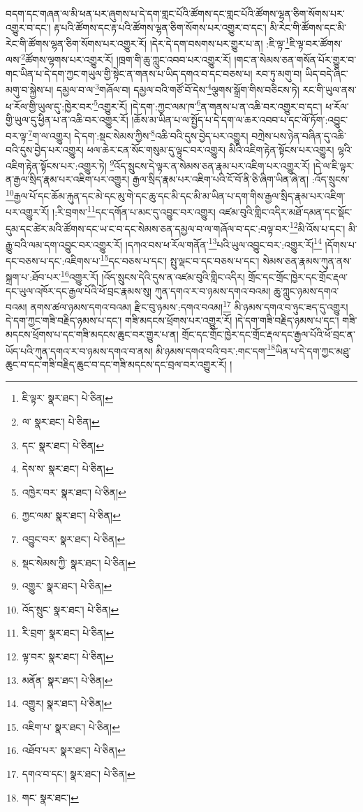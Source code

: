 བདག་དང་གཞན་ལ་མི་ཕན་པར་ཞུགས་པ་དེ་དག་གླང་པོའི་ཚོགས་དང་གླང་པོའི་ཚོགས་ལྷན་ཅིག་སོགས་པར་འགྱུར་བ་དང་། རྟ་པའི་ཚོགས་དང་རྟ་པའི་ཚོགས་ལྷན་ཅིག་སོགས་པར་འགྱུར་བ་དང་། མི་རེང་གི་ཚོགས་དང་མི་རེང་གི་ཚོགས་ལྷན་ཅིག་སོགས་པར་འགྱུར་རོ། །དེར་དེ་དག་བསགས་པར་གྱུར་པ་ན། :ཇི་ལྟ་\footnote{ཇི་ལྟར་  སྣར་ཐང་།  པེ་ཅིན། }ཇི་ལྟ་བར་ཚོགས་ལས་\footnote{ལ་  སྣར་ཐང་།  པེ་ཅིན། }ཚོགས་ལྷགས་པར་འགྱུར་རོ། །ཁྲག་གི་ཆུ་ཀླུང་འབབ་པར་འགྱུར་རོ། །གང་ན་སེམས་ཅན་གསོན་པོར་གྱུར་བ་གང་ཡིན་པ་དེ་དག་ཀྱང་གཡུལ་གྱི་སྟེང་ན་གནས་པ་ཡིད་དགའ་བ་དང་བཅས་པ། རབ་ཏུ་མགུ་བ། ཡིད་བདེ་ཞིང་མགུ་བ་སྐྱེས་པ། དམྱལ་བ་ལ་\footnote{དང་  སྣར་ཐང་།  པེ་ཅིན། }གཞོལ་བ། དམྱལ་བའི་གཙོ་བོ་དེས་\footnote{དེས་ས་  སྣར་ཐང་།  པེ་ཅིན། }ལྕགས་སྒྲོག་གིས་བཅིངས་ཏེ། རང་གི་ཡུལ་ནས་ཕ་རོལ་གྱི་ཡུལ་དུ་:ཁྱེར་བར་\footnote{འཁྱེར་བར་  སྣར་ཐང་།  པེ་ཅིན། }འགྱུར་རོ། །དེ་དག་:ཀྱང་ལམ་ཁ་\footnote{ཀྱང་ལམ་  སྣར་ཐང་།  པེ་ཅིན། }ན་གནས་པ་ན་འཆི་བར་འགྱུར་བ་དང་། ཕ་རོལ་གྱི་ཡུལ་དུ་ཕྱིན་པ་ན་འཆི་བར་འགྱུར་རོ། །ཆོས་མ་ཡིན་པ་ལ་སྤྱོད་པ་དེ་དག་ལ་ཆར་འབབ་པ་དང་ལོ་ཏོག་:འབྱུང་བར་ལྟ་\footnote{འབྱུང་བར་  སྣར་ཐང་།  པེ་ཅིན། }ག་ལ་འགྱུར། དེ་དག་:སྡང་སེམས་ཀྱིས་\footnote{སྡང་སེམས་ཀྱི་  སྣར་ཐང་།  པེ་ཅིན། }འཆི་བའི་དུས་བྱེད་པར་འགྱུར། བཀྲེས་པས་ཉེན་བཞིན་དུ་འཆི་བའི་དུས་བྱེད་པར་འགྱུར། ཕལ་ཆེར་ངན་སོང་གསུམ་དུ་ལྟུང་བར་འགྱུར། མིའི་འཇིག་རྟེན་སྟོངས་པར་འགྱུར། ལྷའི་འཇིག་རྟེན་སྟོངས་པར་:འགྱུར་ཏེ། \footnote{འགྱུར་  སྣར་ཐང་།  པེ་ཅིན། }འོད་སྲུངས་དེ་ལྟར་ན་སེམས་ཅན་རྣམ་པར་འཇིག་པར་འགྱུར་རོ། །དེ་ལ་ཇི་ལྟར་ན་རྒྱལ་སྲིད་རྣམ་པར་འཇིག་པར་འགྱུར། རྒྱལ་སྲིད་རྣམ་པར་འཇིག་པའི་ངོ་བོ་ནི་ཅི་ཞིག་ཡིན་ཞེ་ན། :འོད་སྲུངས་\footnote{འོད་སྲུང་  སྣར་ཐང་།  པེ་ཅིན། }རྒྱལ་པོ་དང་ཆོམ་རྐུན་དང་མེ་དང་མུ་གེ་དང་ཆུ་དང་མི་དང་མི་མ་ཡིན་པ་དག་གིས་རྒྱལ་སྲིད་རྣམ་པར་འཇིག་པར་འགྱུར་རོ། །:རི་བྲགས་\footnote{རི་བྲག་  སྣར་ཐང་།  པེ་ཅིན། }དང་དགོན་པ་མང་དུ་འབྱུང་བར་འགྱུར། འཛམ་བུའི་གླིང་འདིར་མཐོ་དམན་དང་སྡོང་དུམ་དང་ཚེར་མའི་ཚོགས་དང་ཡ་ང་བ་དང་སེམས་ཅན་དམྱལ་བ་ལ་གཞོལ་བ་དང་:བལྟ་བར་\footnote{ལྟ་བར་  སྣར་ཐང་།  པེ་ཅིན། }མི་འོས་པ་དང་། མི་རྒྱུ་བའི་ལམ་དག་འབྱུང་བར་འགྱུར་རོ། །དཀའ་བས་ཕ་རོལ་གནོན་\footnote{མནོན་  སྣར་ཐང་།  པེ་ཅིན། }པའི་ཡུལ་འབྱུང་བར་:འགྱུར་རོ།\footnote{འགྱུར།  སྣར་ཐང་།  པེ་ཅིན། } །དོགས་པ་དང་བཅས་པ་དང་:འཇིགས་པ་\footnote{འཇིག་པ་  སྣར་ཐང་།  པེ་ཅིན། }དང་བཅས་པ་དང་། སྤུ་ལྡང་བ་དང་བཅས་པ་དང་། སེམས་ཅན་རྣམས་ཀུན་ནས་སྐྲག་པ་:ཐོབ་པར་\footnote{འཐོབ་པར་  སྣར་ཐང་།  པེ་ཅིན། }འགྱུར་རོ། །འོད་སྲུངས་དེའི་དུས་ན་འཛམ་བུའི་གླིང་འདིར། གྲོང་དང་གྲོང་ཁྱེར་དང་གྲོང་རྡལ་དང་ཡུལ་འཁོར་དང་རྒྱལ་པོའི་ཕོ་བྲང་རྣམས་སུ། ཀུན་དགའ་ར་བ་ཉམས་དགའ་བའམ། ཆུ་ཀླུང་ཉམས་དགའ་བའམ། ནགས་ཚལ་ཉམས་དགའ་བའམ། རྫིང་བུ་ཉམས་:དགའ་བའམ།\footnote{དགའ་བ་དང་།  སྣར་ཐང་།  པེ་ཅིན། } མི་ཉམས་དགའ་བ་ཉུང་ཟད་དུ་འགྱུར། དེ་དག་ཀྱང་གཟི་བརྗིད་ཉམས་པ་དང་། གཟི་མདངས་ཕྲོགས་པར་འགྱུར་རོ། །དེ་དག་གཟི་བརྗིད་ཉམས་པ་དང་། གཟི་མདངས་ཕྲོགས་པ་དང་གཟི་མདངས་ཆུང་བར་གྱུར་པ་ན། གྲོང་དང་གྲོང་ཁྱེར་དང་གྲོང་རྡལ་དང་རྒྱལ་པོའི་ཕོ་བྲང་ན་ཡོད་པའི་ཀུན་དགའ་ར་བ་ཉམས་དགའ་བ་ནས། མི་ཉམས་དགའ་བའི་བར་:གང་དག་\footnote{གང་  སྣར་ཐང་། }ཡིན་པ་དེ་དག་ཀྱང་མཐུ་ཆུང་བ་དང་གཟི་བརྗིད་ཆུང་བ་དང་གཟི་མདངས་དང་བྲལ་བར་འགྱུར་རོ། །
